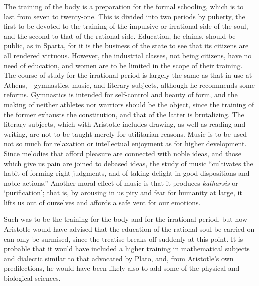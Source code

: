 \documentclass[
]{book}
\begin{document}
The training of the body is a preparation for the formal schooling, which is to last from seven to twenty-one. This is divided into two periods by puberty, the first to be devoted to the training of the impulsive or irrational side of the soul, and the second to that of the rational side. Education, he claims, should be public, as in Sparta, for it is the business of the state to see that its citizens are all rendered virtuous. However, the industrial classes, not being citizens, have no need of education, and women are to be limited in the scope of their training. The course of study for the irrational period is largely the same as that in use at Athens, - gymnastics, music, and literary subjects, although he recommends some reforms. Gymnastics is intended for self-control and beauty of form, and the making of neither athletes nor warriors should be the object, since the training of the former exhausts the constitution, and that of the latter is brutalizing. The literary subjects, which with Aristotle includes drawing, as well as reading and writing, are not to be taught merely for utilitarian reasons. Music is to be used not so much for relaxation or intellectual enjoyment as for higher development. Since melodies that afford pleasure are connected with noble ideas, and those which give us pain are joined to debased ideas, the study of music ``cultivates the habit of forming right judgments, and of taking delight in good dispositions and noble actions.'' Another moral effect of music is that it produces \emph{katharsis} or `purification'; that is, by arousing in us pity and fear for humanity at large, it lifts us out of ourselves and affords a safe vent for our emotions.

Such was to be the training for the body and for the irrational period, but how Aristotle would have advised that the education of the rational soul be carried on can only be surmised, since the treatise breaks off suddenly at this point. It is probable that it would have included a higher training in mathematical subjects and dialectic similar to that advocated by Plato, and, from Aristotle's own predilections, he would have been likely also to add some of the physical and biological sciences.
\end{document}
